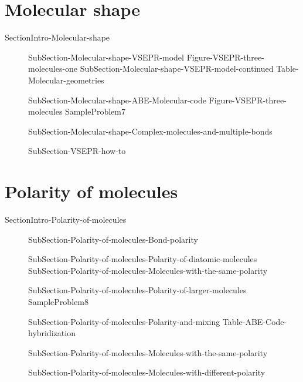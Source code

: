\documentclass[main.tex]{subfiles}
\newcommand\chapterlabel{Ch-electronicstructure}\setcounter{figurenewcounter}{0}\setcounter{tablenewcounter}{0}\setcounter{formulanewcounter}{0}\chapterpicture{../{\chapterlabel}/figure1}\chapterpicturelabel{PxFuel}
\begin{document}
\section{Molecular shape}{SectionIntro-Molecular-shape}
\sloppy\begin{description}
\item[] {SubSection-Molecular-shape-VSEPR-model}
{Figure-VSEPR-three-molecules-one}
 {SubSection-Molecular-shape-VSEPR-model-continued}
{Table-Molecular-geometries}
\item[] {SubSection-Molecular-shape-ABE-Molecular-code}
{Figure-VSEPR-three-molecules}
{SampleProblem7}
\item[] {SubSection-Molecular-shape-Complex-molecules-and-multiple-bonds}
\item[]{SubSection-VSEPR-how-to}  
\end{description}

\section{Polarity of molecules}{SectionIntro-Polarity-of-molecules}
\sloppy \begin{description}
\item[] {SubSection-Polarity-of-molecules-Bond-polarity}
\item[] {SubSection-Polarity-of-molecules-Polarity-of-diatomic-molecules}
{SubSection-Polarity-of-molecules-Molecules-with-the-same-polarity}
\item[] {SubSection-Polarity-of-molecules-Polarity-of-larger-molecules}
{SampleProblem8}
\item[] {SubSection-Polarity-of-molecules-Polarity-and-mixing}
{Table-ABE-Code-hybridization}
\item[] {SubSection-Polarity-of-molecules-Molecules-with-the-same-polarity}
\item[] {SubSection-Polarity-of-molecules-Molecules-with-different-polarity}
\end{description}
\end{document}
